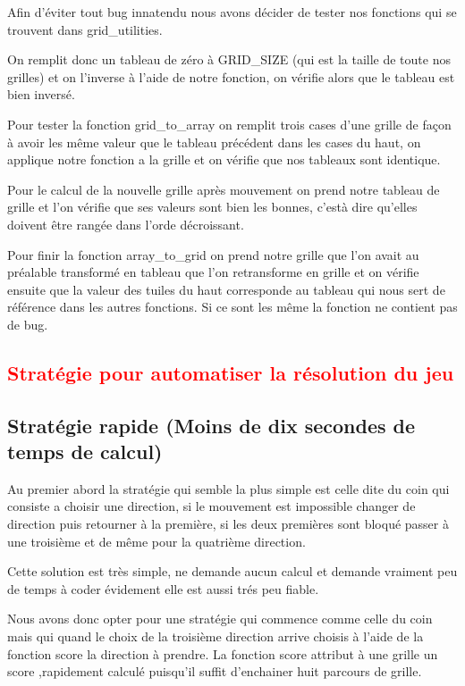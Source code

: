 \documentclass{article}
\begin{document}
  Afin d'éviter tout bug innatendu nous avons décider de tester nos fonctions qui se trouvent dans grid\_utilities.

  On remplit donc un tableau de zéro à GRID\_SIZE (qui est la taille de toute nos grilles) et on l'inverse à l'aide de notre fonction, on vérifie alors que le tableau est bien inversé.

  Pour tester la fonction grid\_to\_array on remplit trois cases d'une grille de façon à avoir les même valeur que le tableau précédent dans les cases du haut, on applique notre fonction a la grille et on vérifie que nos tableaux sont identique.

  Pour le calcul de la nouvelle grille après mouvement on prend notre tableau de grille et l'on vérifie que ses valeurs sont bien les bonnes, c'està dire qu'elles doivent être rangée dans l'orde décroissant.

  Pour finir la fonction array\_to\_grid on prend notre grille que l'on avait au préalable transformé en tableau que l'on retransforme en grille et on vérifie ensuite que la valeur des tuiles du haut corresponde au tableau qui nous sert de référence dans les autres fonctions. Si ce sont les même la fonction ne contient pas de bug.
  
  \textcolor{red}{\section{Stratégie pour automatiser la résolution du jeu}}
  \subsection{Stratégie rapide (Moins de dix secondes de temps de calcul)}
  Au premier abord la stratégie qui semble la plus simple est celle dite du coin qui consiste a choisir une direction, si le mouvement est impossible changer de direction puis retourner à la première, si les deux premières sont bloqué passer à une troisième et de même pour la quatrième direction.

  Cette solution est très simple, ne demande aucun calcul et demande vraiment peu de temps à coder évidement elle est aussi trés peu fiable.

  Nous avons donc opter pour une stratégie qui commence comme celle du coin mais qui quand le choix de la troisième direction arrive choisis à l'aide de la fonction score la direction à prendre. La fonction score attribut à une grille un score ,rapidement calculé puisqu'il suffit d'enchainer huit parcours de grille.
\end{document}
